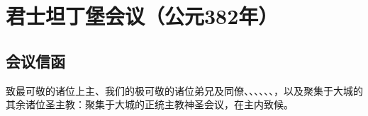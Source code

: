 
\chapter{君士坦丁堡会议（公元382年）}



\section{会议信函}

致最可敬的诸位上主、我们的极可敬的诸位弟兄及同僚、、、、、、，以及聚集于大城的其余诸位圣主教：聚集于大城的正统主教神圣会议，在主内致候。\par

